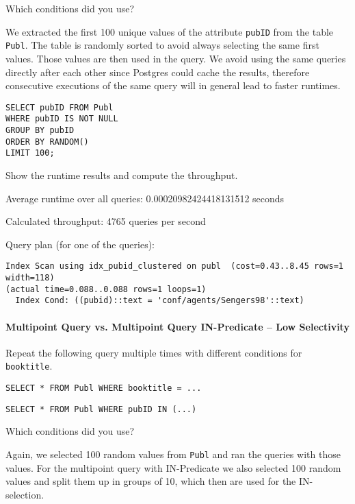\documentclass[11pt]{scrartcl}
\begin{document}
Which conditions did you use?

We extracted the first 100 unique values of the attribute \texttt{pubID} from the table \texttt{Publ}. The table is randomly sorted to avoid always selecting the same first values. Those values are then used in the query. We avoid using the same queries directly after each other since Postgres could cache the results, therefore consecutive executions of the same query will in general lead to faster runtimes.

\begin{lstlisting}[style=dbtsql]
SELECT pubID FROM Publ
WHERE pubID IS NOT NULL 
GROUP BY pubID
ORDER BY RANDOM() 
LIMIT 100;
\end{lstlisting}

Show the runtime results and compute the throughput.

Average runtime over all queries: 0.00020982424418131512 seconds

Calculated throughput: 4765 queries per second

Query plan (for one of the queries):

{\small
\parskip0pt\begin{verbatim}
Index Scan using idx_pubid_clustered on publ  (cost=0.43..8.45 rows=1 width=118) 
(actual time=0.088..0.088 rows=1 loops=1)
  Index Cond: ((pubid)::text = 'conf/agents/Sengers98'::text)
\end{verbatim}}

\paragraph{Multipoint Query vs. Multipoint Query IN-Predicate -- Low Selectivity}

Repeat the following query multiple times with different conditions for \texttt{booktitle}.

\begin{lstlisting}[style=dbtsql]
SELECT * FROM Publ WHERE booktitle = ...
\end{lstlisting}

\begin{lstlisting}[style=dbtsql]
SELECT * FROM Publ WHERE pubID IN (...)
\end{lstlisting}

Which conditions did you use?

Again, we selected 100 random values from \texttt{Publ} and ran the queries with those values. For the multipoint query with IN-Predicate we also selected 100 random values and split them up in groups of 10, which then are used for the IN-selection.
\end{document}
